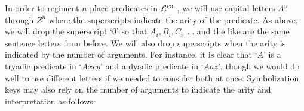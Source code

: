 %
%
%
%

In order to regiment  $n$-place predicates in $\mathcal{L}^{\textsc{fol}}$, we will use capital letters $A^n$ through $Z^n$ where the superscripts indicate the arity of the predicate.
As above, we will drop the superscript `$0$' so that $A_i, B_i, C_i, \ldots$ and the like are the same sentence letters from before. 
We will also drop superscripts when the arity is indicated by the number of arguments.
For instance, it is clear that `$A$' is a tryadic predicate in `$Axcy$' and a dyadic predicate in `$Aaz$', though we would do well to use different letters if we needed to consider both at once.
Symbolization keys may also rely on the number of arguments to indicate the arity and interpretation as follows:

